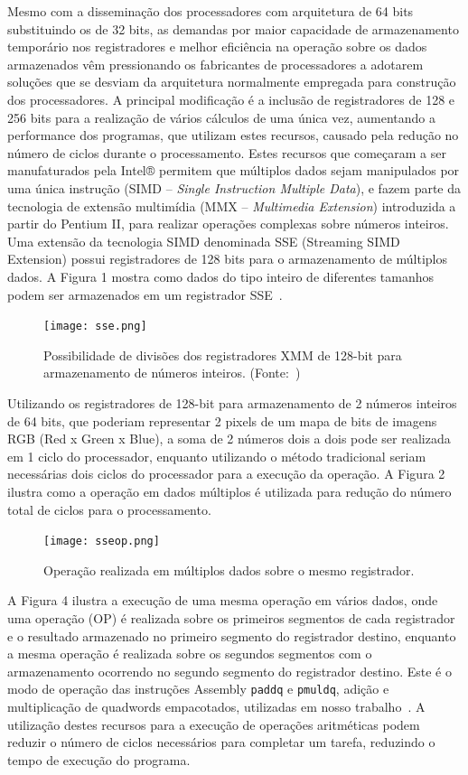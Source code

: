 \documentclass[a4paper]{article}
\begin{document}
Mesmo com a disseminação dos processadores com arquitetura de 64 bits
substituindo os de 32 bits, as demandas por maior capacidade de
armazenamento temporário nos registradores e melhor eficiência na
operação sobre os dados armazenados vêm pressionando os fabricantes de
processadores a adotarem soluções que se desviam da arquitetura
normalmente empregada para construção dos processadores.  A principal
modificação é a inclusão de registradores de 128 e 256 bits para a
realização de vários cálculos de uma única vez, aumentando a
performance dos programas, que utilizam estes recursos, causado pela
redução no número de ciclos durante o processamento.  Estes recursos
que começaram a ser manufaturados pela Intel® permitem que múltiplos
dados sejam manipulados por uma única instrução (SIMD – {\em Single
Instruction Multiple Data}), e fazem parte da tecnologia de extensão
multimídia (MMX – {\em Multimedia Extension}) introduzida a partir do
Pentium II, para realizar operações complexas sobre números inteiros.
Uma extensão da tecnologia SIMD denominada SSE (Streaming SIMD
Extension) possui registradores de 128 bits para o armazenamento de
múltiplos dados. A Figura 1 mostra como dados do tipo inteiro de
diferentes tamanhos podem ser armazenados em um registrador
SSE~\cite{blum}.

\begin{figure}[h]
  \centering
  \texttt{[image: sse.png]}
  \caption{ Possibilidade de divisões dos registradores XMM de 128-bit
    para armazenamento de números inteiros.  (Fonte:~\cite{ray})}
\label{fig:xmm128}
\end{figure}

Utilizando os registradores de 128-bit para armazenamento de 2 números
inteiros de 64 bits, que poderiam representar 2 pixels de um mapa de
bits de imagens RGB (Red x Green x Blue), a soma de 2 números dois a
dois pode ser realizada em 1 ciclo do processador, enquanto utilizando
o método tradicional seriam necessárias dois ciclos do processador
para a execução da operação. A Figura 2 ilustra como a operação em
dados múltiplos é utilizada para redução do número total de ciclos
para o processamento.

\begin{figure}[h]
  \centering
    \texttt{[image: sseop.png]}
  \caption{Operação realizada em múltiplos dados sobre o mesmo registrador.}
  \label{fig:simd}
\end{figure}

A Figura 4 ilustra a execução de uma mesma operação em vários dados,
onde uma operação (OP) é realizada sobre os primeiros segmentos de
cada registrador e o resultado armazenado no primeiro segmento do
registrador destino, enquanto a mesma operação é realizada sobre os
segundos segmentos com o armazenamento ocorrendo no segundo segmento
do registrador destino. Este é o modo de operação das instruções
Assembly {\tt paddq} e {\tt pmuldq}, adição e multiplicação de quadwords
empacotados, utilizadas em nosso trabalho~\cite{intel}.  A utilização
destes recursos para a execução de operações aritméticas podem reduzir
o número de ciclos necessários para completar um tarefa, reduzindo o
tempo de execução do programa.  
\end{document}
